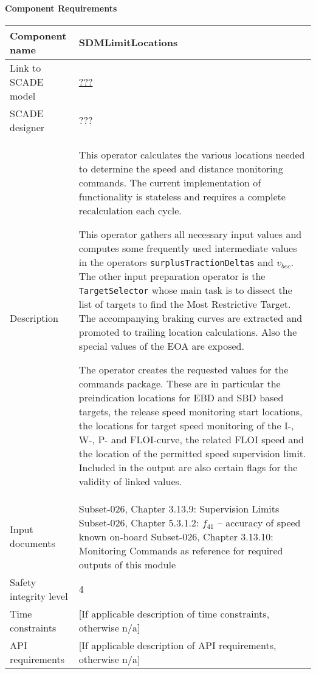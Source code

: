 
\paragraph{Component Requirements}

\begin{longtable}{p{}p{}}
\toprule
Component name			& SDMLimitLocations \\
\midrule
Link to SCADE model		& {\footnotesize \url{???}} \\
\midrule
SCADE designer			& ??? \\
\midrule
Description				& This operator calculates the various locations needed to determine the speed and distance monitoring commands. The current implementation of functionality is stateless and requires a complete recalculation each cycle. 

This operator gathers all necessary input values and computes some frequently used intermediate values in the operators \texttt{surplusTractionDeltas} and \texttt{$v_{\mathit{bec}}$}. The other input preparation operator is the \texttt{TargetSelector} whose main task is to dissect the list of targets to find the Most Restrictive Target. The accompanying braking curves are extracted and promoted to trailing location calculations. Also the special values of the EOA are exposed.

The operator creates the requested values for the commands package. These are in particular the preindication locations for EBD and SBD based targets, the release speed monitoring start locations, the locations for target speed monitoring of the I-, W-, P- and FLOI-curve, the related FLOI speed and the location of the permitted speed supervision limit. Included in the output are also certain flags for the validity of linked values.\\
\midrule
Input documents	& 
Subset-026, Chapter 3.13.9: Supervision Limits \newline
Subset-026, Chapter 5.3.1.2: $f_{41}$ -- accuracy of speed known on-board\newline
Subset-026, Chapter 3.13.10: Monitoring Commands as reference for required outputs of this module \\
\midrule
Safety integrity level		& 4 \\
\midrule
Time constraints		& [If applicable description of time constraints, otherwise n/a] \\
\midrule
API requirements 		& [If applicable description of API requirements, otherwise n/a] \\
\bottomrule
\end{longtable}